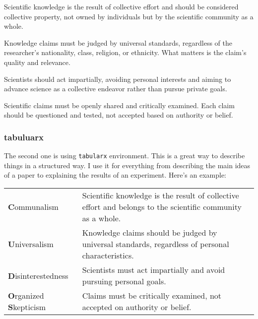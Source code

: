 \begin{description}[leftmargin=1.5cm,labelsep=0.5cm,style=nextline]
      \item[\textbf{C}ommunalism] Scientific knowledge is the result of collective effort and should be considered collective property, not owned by individuals but by the scientific community as a whole.

      \item[\textbf{U}niversalism] Knowledge claims must be judged by universal standards, regardless of the researcher's nationality, class, religion, or ethnicity. What matters is the claim's quality and relevance.

      \item[\textbf{D}isinterestedness] Scientists should act impartially, avoiding personal interests and aiming to advance science as a collective endeavor rather than pursue private goals.

      \item[\textbf{O}rganized \textbf{S}kepticism] Scientific claims must be openly shared and critically examined. Each claim should be questioned and tested, not accepted based on authority or belief.
\end{description}

\subsubsection*{tabuluarx}
The second one is using \texttt{tabularx} environment. This is a great way to describe things in a structured way. I use it for everything from describing the main ideas of a paper to explaining the results of an experiment. Here's an example: \\

\begin{tabularx}{\linewidth}{@{}lX@{}}
      \textbf{C}ommunalism                   & Scientific knowledge is the result of collective effort and belongs to the scientific community as a whole. \\
      \textbf{U}niversalism                  & Knowledge claims should be judged by universal standards, regardless of personal characteristics.           \\
      \textbf{D}isinterestedness             & Scientists must act impartially and avoid pursuing personal goals.                                          \\
      \textbf{O}rganized \textbf{S}kepticism & Claims must be critically examined, not accepted on authority or belief.                                    \\
\end{tabularx}
